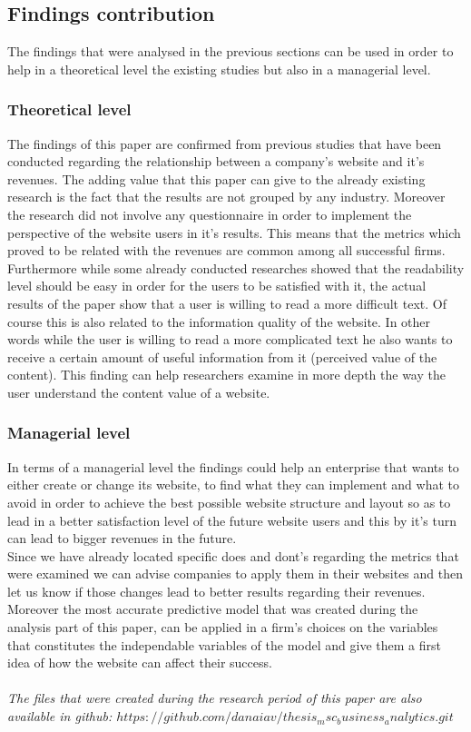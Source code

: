 \documentclass{article}
\begin{document}
\subsection{Findings contribution}
The findings that were analysed in the previous sections can be used in order to help in a theoretical level the existing studies but also in a managerial level.
\subsubsection{Theoretical level}
The findings of this paper are confirmed from previous studies that have been conducted regarding the relationship between a company's website and it's revenues. The adding value that this paper can give to the already existing research is the fact that the results are not grouped by any industry. Moreover the research did not involve any questionnaire in order to implement the perspective of the website users in it's results. This means that the metrics which proved to be related with the revenues are common among all successful firms.\\
Furthermore while some already conducted researches showed that the readability level should be easy in order for the users to be satisfied with it, the actual results of the paper show that a user is willing to read a more difficult text. Of course this is also related to the information quality of the website. In other words while the user is willing to read a more complicated text he also wants to receive a certain amount of useful information from it (perceived value of the content). This finding can help researchers examine in more depth the way the user understand the content value of a website.
\subsubsection{Managerial level}
In terms of a managerial level the findings could help an enterprise that wants to either create or change its website, to find what they can implement and what to avoid in order to achieve the best possible website structure and layout so as to lead in a better satisfaction level of the future website users and this by it's turn can lead to bigger revenues in the future.\\
Since we have already located specific does and dont's regarding the metrics that were examined we can advise companies to apply them in their websites and then let us know if those changes lead to better results regarding their revenues.\\
Moreover the most accurate predictive model that was created during the analysis part of this paper, can be applied in a firm's choices on the variables that constitutes the independable variables of the model and give them a first idea of how the website can affect their success.\\\\
\textit{The files that were created during the research period of this paper are also available in github: $https://github.com/danaiav/thesis_msc_business_analytics.git$ }
\pagebreak
\end{document}
